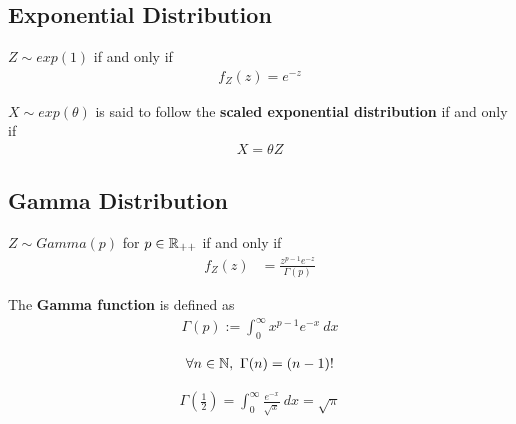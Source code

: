 \documentclass{article}
\begin{document}
   	\subsection{Exponential Distribution}
   	\begin{definition}
   		$Z \sim exp(1)$ if and only if
   		\begin{align}
   			f_Z(z) = e^{-z}
   		\end{align}
   	\end{definition}
   	
   	\begin{definition}
   		$X \sim exp(\theta)$ is said to follow the \textbf{scaled exponential distribution} if and only if
   		\begin{align}
   			X = \theta Z
   		\end{align}
   	\end{definition}
   	
   	\subsection{Gamma Distribution}
   	
   	\begin{definition}
   		$Z \sim Gamma(p)$ for $p \in \mathbb{R}_{++}$ if and only if
   		\begin{align}
   			f_Z(z) &= \frac{z^{p-1} e^{-z}}{\Gamma(p)}
   		\end{align}
   	\end{definition}
 
   	\begin{definition}
   		The \textbf{Gamma function} is defined as
   		\begin{align}
   			\Gamma(p) := \int_0^\infty x^{p-1} e^{-x}\ dx
   		\end{align}
   	\end{definition}
   	
   	\begin{proposition}
   		\begin{align}
   			\forall n \in \mathbb{N},\ \Gamma(n) = (n-1)!
   		\end{align}
   	\end{proposition}
   	
   	\begin{proposition}
   		\begin{align}
   			\Gamma\left(\frac{1}{2}\right) = \int_0^\infty \frac{e^{-x}}{\sqrt{x}}\ dx = \sqrt{\pi}
   		\end{align}
   	\end{proposition}
   	
\end{document}
